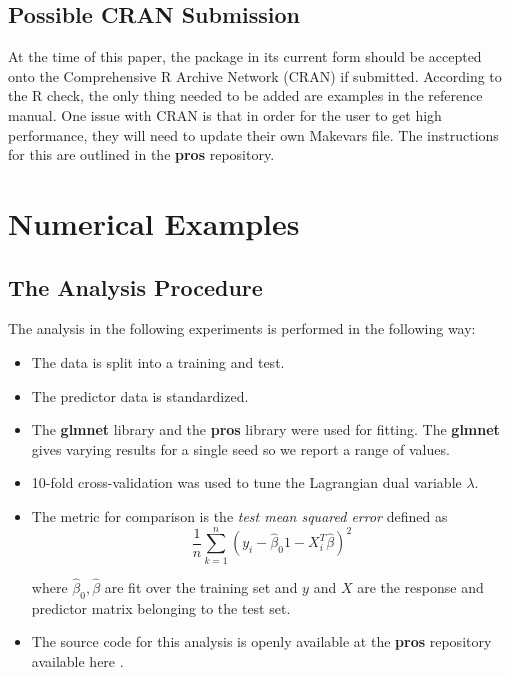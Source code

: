 \documentclass[article]{jss}
\numberwithin{equation}{section}
\begin{document}
\subsection{Possible CRAN Submission}

At the time of this paper, the package in its current form should be accepted onto the Comprehensive R Archive Network (CRAN) if submitted.
According to the R check, the only thing needed to be added are examples in the reference manual.
One issue with CRAN is that in order for the user to get high performance, they will need to update their own Makevars file. The instructions for this are outlined in the \textbf{pros} repository.

\section{Numerical Examples}

\subsection{The Analysis Procedure}

The analysis in the following experiments is performed in the following way:

\begin{itemize}

\item The data is split into a training and test.

\item The predictor data is standardized.

\item The \textbf{glmnet} library and the \textbf{pros} library were used for fitting. The \textbf{glmnet} gives varying results for a single seed so we report a range of values.

\item 10-fold cross-validation was used to tune the Lagrangian dual variable $\lambda$.

\item The metric for comparison is the \textit{test mean squared error} defined as
\[
\frac{1}{n}\sum_{k = 1}^n \left( y_i - \hat \beta_0 1 - X_i^T \hat \beta \right)^2
\]

where $\hat \beta_0, \hat \beta$ are fit over the training set and $y$ and $X$ are the response and predictor matrix belonging to the test set.

\item The source code for this analysis is openly available at the \textbf{pros} repository available here \cite{pros}.

\end{itemize}
\end{document}
